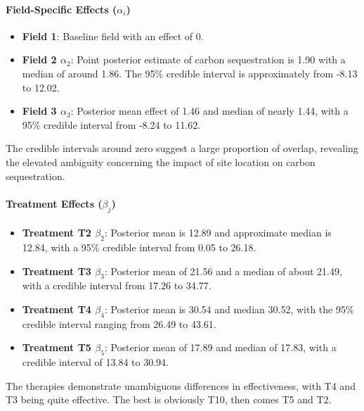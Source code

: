 \documentclass[
]{article}
\providecommand{\tightlist}{%
  \setlength{\itemsep}{0pt}\setlength{\parskip}{0pt}}
\begin{document}
\paragraph{\texorpdfstring{Field-Specific Effects
(\(\alpha_i\))}{Field-Specific Effects (\textbackslash alpha\_i)}}\label{field-specific-effects-alpha_i}

\begin{itemize}
\tightlist
\item
  \textbf{Field 1}: Baseline field with an effect of 0.
\item
  \textbf{Field 2 \(\alpha_2\)}: Point posterior estimate of carbon
  sequestration is 1.90 with a median of around 1.86. The 95\% credible
  interval is approximately from -8.13 to 12.02.
\item
  \textbf{Field 3 \(\alpha_3\)}: Posterior mean effect of 1.46 and
  median of nearly 1.44, with a 95\% credible interval from -8.24 to
  11.62.
\end{itemize}

The credible intervals around zero suggest a large proportion of
overlap, revealing the elevated ambiguity concerning the impact of site
location on carbon sequestration.

\paragraph{\texorpdfstring{Treatment Effects
(\(\beta_j\))}{Treatment Effects (\textbackslash beta\_j)}}\label{treatment-effects-beta_j}

\begin{itemize}
\tightlist
\item
  \textbf{Treatment T2 \(\beta_2\)}: Posterior mean is 12.89 and
  approximate median is 12.84, with a 95\% credible interval from 0.05
  to 26.18.
\item
  \textbf{Treatment T3 \(\beta_3\)}: Posterior mean of 21.56 and a
  median of about 21.49, with a credible interval from 17.26 to 34.77.
\item
  \textbf{Treatment T4 \(\beta_4\)}: Posterior mean is 30.54 and median
  30.52, with the 95\% credible interval ranging from 26.49 to 43.61.
\item
  \textbf{Treatment T5 \(\beta_5\)}: Posterior mean of 17.89 and median
  of 17.83, with a credible interval of 13.84 to 30.94.
\end{itemize}

The therapies demonstrate unambiguous differences in effectiveness, with
T4 and T3 being quite effective. The best is obviously T10, then comes
T5 and T2.
\end{document}
